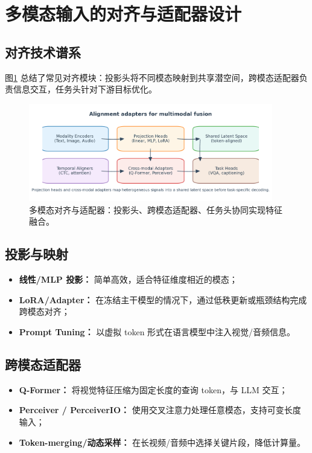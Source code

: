 \documentclass[UTF8,zihao=-4]{ctexart}
\begin{document}
\section{多模态输入的对齐与适配器设计}
\subsection{对齐技术谱系}
图\ref{fig:alignment_adapters_cn} 总结了常见对齐模块：投影头将不同模态映射到共享潜空间，跨模态适配器负责信息交互，任务头针对下游目标优化。
\begin{figure}[H]
  \centering
  \includegraphics[width=0.95\textwidth]{alignment_adapters.png}
  \caption{多模态对齐与适配器：投影头、跨模态适配器、任务头协同实现特征融合。}
  \label{fig:alignment_adapters_cn}
\end{figure}

\subsection{投影与映射}
\begin{itemize}
  \item \textbf{线性/MLP 投影：} 简单高效，适合特征维度相近的模态；
  \item \textbf{LoRA/Adapter：} 在冻结主干模型的情况下，通过低秩更新或瓶颈结构完成跨模态对齐；
  \item \textbf{Prompt Tuning：} 以虚拟 token 形式在语言模型中注入视觉/音频信息。
\end{itemize}

\subsection{跨模态适配器}
\begin{itemize}
  \item \textbf{Q-Former：} 将视觉特征压缩为固定长度的查询 token，与 LLM 交互；
  \item \textbf{Perceiver / PerceiverIO：} 使用交叉注意力处理任意模态，支持可变长度输入；
  \item \textbf{Token-merging/动态采样：} 在长视频/音频中选择关键片段，降低计算量。
\end{itemize}
\end{document}
